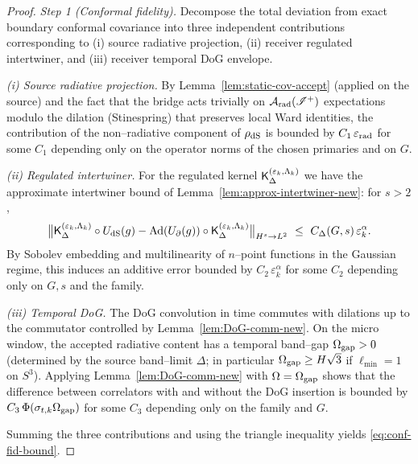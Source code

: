 \documentclass[10pt]{article}
\theoremstyle{definition}
\theoremstyle{plain}
\begin{document}
\begin{proof}
\emph{Step 1 (Conformal fidelity).}
Decompose the total deviation from exact boundary conformal covariance into three independent contributions corresponding to (i) source radiative projection, (ii) receiver regulated intertwiner, and (iii) receiver temporal DoG envelope.

\smallskip
\emph{(i) Source radiative projection.} By Lemma~\ref{lem:static-cov-accept} (applied on the source) and the fact that the bridge acts trivially on $\mathcal A_{\rm rad}(\mathscr I^+)$ expectations modulo the dilation (Stinespring) that preserves local Ward identities, the contribution of the non--radiative component of $\rho_{\rm dS}$ is bounded by $C_1\,\varepsilon_{\rm rad}$ for some $C_1$ depending only on the operator norms of the chosen primaries and on $G$.

\smallskip
\emph{(ii) Regulated intertwiner.} For the regulated kernel ${\sf K}_\Delta^{(\varepsilon_k,\Lambda_k)}$ we have the approximate intertwiner bound of Lemma~\ref{lem:approx-intertwiner-new}: for $s>2$,
\[
\big\|{\sf K}_\Delta^{(\varepsilon_k,\Lambda_k)} \circ U_{\rm dS}(g) - \mathrm{Ad}(U_\partial(g))\circ {\sf K}_\Delta^{(\varepsilon_k,\Lambda_k)}\big\|_{H^s\to L^2}
\ \le\ C_\Delta(G,s)\,\varepsilon_k^\alpha.
\]
By Sobolev embedding and multilinearity of $n$--point functions in the Gaussian regime, this induces an additive error bounded by $C_2\,\varepsilon_k^\alpha$ for some $C_2$ depending only on $G,s$ and the family.

\smallskip
\emph{(iii) Temporal DoG.} The DoG convolution in time commutes with dilations up to the commutator controlled by Lemma~\ref{lem:DoG-comm-new}. On the micro window, the accepted radiative content has a temporal band--gap $\Omega_{\rm gap}>0$ (determined by the source band--limit $\Delta$; in particular $\Omega_{\rm gap}\ge H\sqrt{3}$ if $\ell_{\min}=1$ on $S^3$). Applying Lemma~\ref{lem:DoG-comm-new} with $\Omega=\Omega_{\rm gap}$ shows that the difference between correlators with and without the DoG insertion is bounded by $C_3\,\Phi(\sigma_{t,k}\Omega_{\rm gap})$ for some $C_3$ depending only on the family and $G$.

\smallskip
Summing the three contributions and using the triangle inequality yields \eqref{eq:conf-fid-bound}.


\end{proof}
\end{document}
